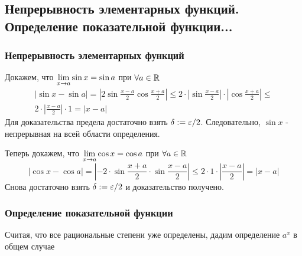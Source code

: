 
\subsection{Непрерывность элементарных функций. Определение показательной функции...}

\subsubsection{Непрерывность элементарных функций}
Докажем, что $\lim\limits_{x \to a} \sin x = \sin a$ при $\forall a \in \mathbb{R}$
\begin{multline*}
	|\sin x - \sin a| = \left|2 \sin \frac{x - a}{2} \cos \frac{x + a}{2}\right| \le 2 \cdot \left|\sin \frac{x - a}{2}\right| \cdot \left|\cos \frac{x + a}{2}\right| \le \\
	2 \cdot \left|\frac{x - a}{2}\right| \cdot 1 = |x - a|
\end{multline*}
Для доказательства предела достаточно взять $\delta := \varepsilon / 2$. Следовательно, $\sin x$ - непрерывная на всей области определения.

Теперь докажем, что $\lim\limits_{x \to a} \cos x = \cos a$ при $\forall a \in \mathbb{R}$
\[
	|\cos x - \cos a| = \left|-2 \cdot \sin \frac{x + a}{2} \cdot \sin \frac{x - a}{2} \right| \le 2 \cdot 1 \cdot \left|\frac{x - a}{2}\right| = |x - a|
\]
Снова достаточно взять $\delta := \varepsilon / 2$ и доказательство получено.

\subsubsection{Определение показательной функции}

Считая, что все рациональные степени уже определены, дадим определение $a^x$ в общем случае

